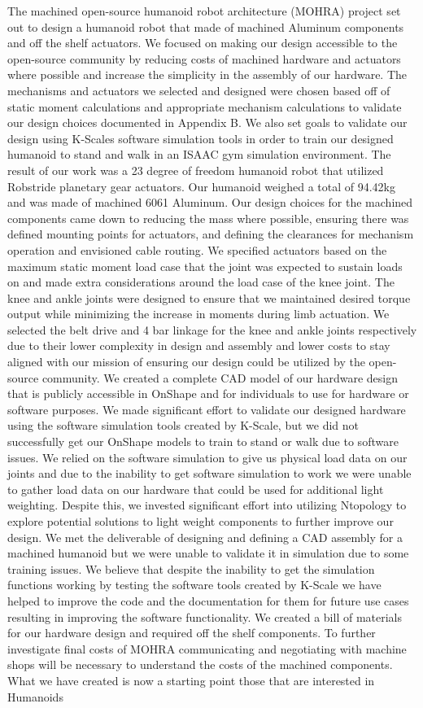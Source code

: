 \documentclass{article}
\begin{document}
The machined open-source humanoid robot architecture (MOHRA) project set out to design a humanoid robot that made of machined Aluminum components and off the shelf actuators. We focused on making our design accessible to the open-source community by reducing costs of machined hardware and actuators where possible and increase the simplicity in the assembly of our hardware. The mechanisms and actuators we selected and designed were chosen based off of static moment calculations and appropriate mechanism calculations to validate our design choices documented in Appendix B. We also set goals to validate our design using K-Scales software simulation tools in order to train our designed humanoid to stand and walk in an ISAAC gym simulation environment. The result of our work was a 23 degree of freedom humanoid robot that utilized Robstride planetary gear actuators. Our humanoid weighed a total of 94.42kg and was made of machined 6061 Aluminum. Our design choices for the machined components came down to reducing the mass where possible, ensuring there was defined mounting points for actuators, and defining the clearances for mechanism operation and envisioned cable routing. We specified actuators based on the maximum static moment load case that the joint was expected to sustain loads on and made extra considerations around the load case of the knee joint. The knee and ankle joints were designed to ensure that we maintained desired torque output while minimizing the increase in moments during limb actuation. We selected the belt drive and 4 bar linkage for the knee and ankle joints respectively due to their lower complexity in design and assembly and lower costs to stay aligned with our mission of ensuring our design could be utilized by the open-source community. We created a complete CAD model of our hardware design that is publicly accessible in OnShape and for individuals to use for hardware or software purposes. We made significant effort to validate our designed hardware using the software simulation tools created by K-Scale, but we did not successfully get our OnShape models to train to stand or walk due to software issues. We relied on the software simulation to give us physical load data on our joints and due to the inability to get software simulation to work we were unable to gather load data on our hardware that could be used for additional light weighting. Despite this, we invested significant effort into utilizing Ntopology to explore potential solutions to light weight components to further improve our design. We met the deliverable of designing and defining a CAD assembly for a machined humanoid but we were unable to validate it in simulation due to some training issues. We believe that despite the inability to get the simulation functions working by testing the software tools created by K-Scale we have helped to improve the code and the documentation for them for future use cases resulting in improving the software functionality. We created a bill of materials for our hardware design and required off the shelf components. To further investigate final costs of MOHRA communicating and negotiating with machine shops will be necessary to understand the costs of the machined components. What we have created is now a starting point those that are interested in Humanoids 
\end{document}
